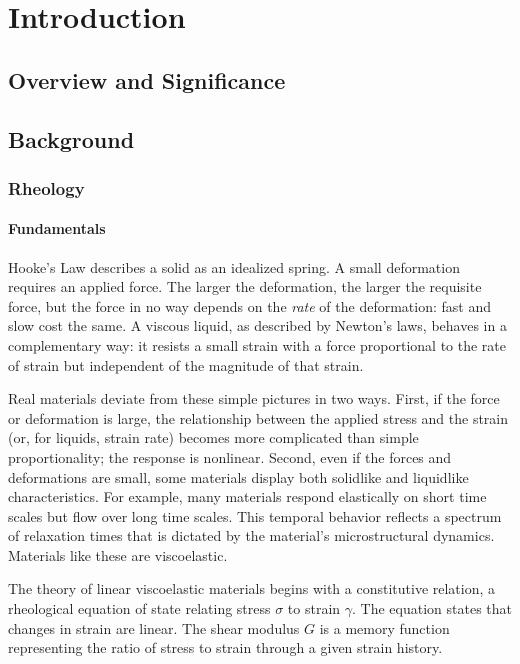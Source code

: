 \chapter{Introduction}

\section{Overview and Significance}

\section{Background}

\subsection{Rheology}

\subsubsection{Fundamentals}

Hooke's Law describes a solid as an idealized spring. A small deformation requires an applied force. The larger the deformation, the larger the requisite force, but the force in no way depends on the \emph{rate} of the deformation: fast and slow cost the same. A viscous liquid, as described by Newton's laws, behaves in a complementary way: it resists a small strain with a force proportional to the rate of strain but independent of the magnitude of that strain.

Real materials deviate from these simple pictures in two ways. First, if the force or deformation is large, the relationship between the applied stress and the strain (or, for liquids, strain rate) becomes more complicated than simple proportionality; the response is nonlinear. Second, even if the forces and deformations are small, some materials display both solidlike and liquidlike characteristics. For example, many materials respond elastically on short time scales but flow over long time scales. This temporal behavior reflects a spectrum of relaxation times that is dictated by the material's microstructural dynamics. Materials like these are viscoelastic.\cite{Ferry1980}

The theory of linear viscoelastic materials begins with a constitutive relation, a rheological equation of state relating stress $\sigma$ to strain $\gamma$. The equation states that changes in strain are linear. The shear modulus $G$ is a memory function representing the ratio of stress to strain through a given strain history.

